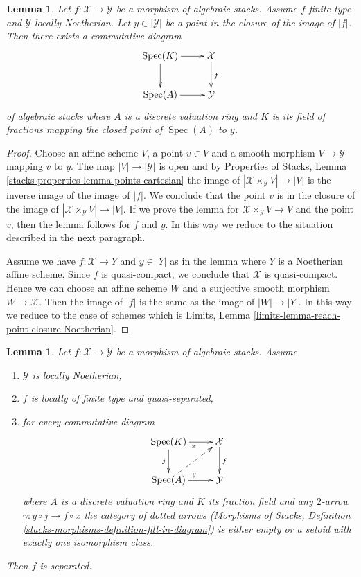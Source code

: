 \documentclass{stacks-project}
\theoremstyle{plain}
\newtheorem{lemma}[subsection]{Lemma}
\theoremstyle{definition}
\theoremstyle{remark}
\numberwithin{equation}{subsection}
\def\Spec{\mathop{\mathrm{Spec}}}
\begin{document}
\begin{lemma}
\label{lemma-reach-point-closure-Noetherian}
Let $f : \mathcal{X} \to \mathcal{Y}$ be a morphism of algebraic stacks.
Assume $f$ finite type and $\mathcal{Y}$ locally Noetherian.
Let $y \in |\mathcal{Y}|$ be a point in the closure of the image of $|f|$.
Then there exists a commutative diagram
$$
\xymatrix{
\Spec(K) \ar[r] \ar[d] & \mathcal{X} \ar[d]^f \\
\Spec(A) \ar[r] & \mathcal{Y}
}
$$
of algebraic stacks where $A$ is a discrete valuation ring and $K$
is its field of fractions mapping the closed point of $\Spec(A)$ to $y$.
\end{lemma}

\begin{proof}
Choose an affine scheme $V$, a point $v \in V$ and a smooth morphism
$V \to \mathcal{Y}$ mapping $v$ to $y$. The map $|V| \to |\mathcal{Y}|$
is open and by
Properties of Stacks, Lemma \ref{stacks-properties-lemma-points-cartesian}
the image of $|\mathcal{X} \times_\mathcal{Y} V| \to |V|$
is the inverse image of the image of $|f|$.
We conclude that the point $v$ is in the closure of the
image of $|\mathcal{X} \times_\mathcal{Y} V| \to |V|$.
If we prove the lemma for
$\mathcal{X} \times_\mathcal{Y} V \to V$ and the point $v$, then
the lemma follows for $f$ and $y$.
In this way we reduce to the situation described in the
next paragraph.

\medskip\noindent
Assume we have $f : \mathcal{X} \to Y$ and $y \in |Y|$ as in the lemma where
$Y$ is a Noetherian affine scheme. Since $f$ is quasi-compact, we conclude that
$\mathcal{X}$ is quasi-compact. Hence we can choose an affine scheme $W$ and
a surjective smooth morphism $W \to \mathcal{X}$. Then the image of
$|f|$ is the same as the image of $|W| \to |Y|$. In this way we reduce
to the case of schemes which is
Limits, Lemma \ref{limits-lemma-reach-point-closure-Noetherian}.
\end{proof}

\begin{lemma}
\label{lemma-check-separated-dvr}
Let $f : \mathcal{X} \to \mathcal{Y}$ be a morphism of algebraic stacks. Assume
\begin{enumerate}
\item $\mathcal{Y}$ is locally Noetherian,
\item $f$ is locally of finite type and quasi-separated,
\item for every commutative diagram
$$
\xymatrix{
\Spec(K) \ar[r]_x \ar[d]_j & \mathcal{X} \ar[d]^f \\
\Spec(A) \ar[r]^y \ar@{-->}[ru] & \mathcal{Y}
}
$$
where $A$ is a discrete valuation ring and $K$ its fraction field
and any $2$-arrow $\gamma : y \circ j \to f \circ x$ the category
of dotted arrows (Morphisms of Stacks, Definition
\ref{stacks-morphisms-definition-fill-in-diagram})
is either empty or a setoid with exactly one isomorphism class.
\end{enumerate}
Then $f$ is separated.
\end{lemma}
\end{document}
